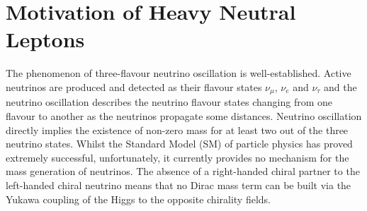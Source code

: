 \section{Motivation of Heavy Neutral Leptons}
\label{sec2Overview}



The phenomenon of three-flavour neutrino oscillation is well-established.
Active neutrinos are produced and detected as their flavour states $\nu_\mu$, $\nu_e$ and $\nu_\tau$ and the neutrino oscillation describes the neutrino flavour states changing from one flavour to another as the neutrinos propagate some distances.
Neutrino oscillation directly implies the existence of non-zero mass for at least two out of the three neutrino states.
Whilst the Standard Model (SM) of particle physics has proved extremely successful, unfortunately, it currently provides no mechanism for the mass generation of neutrinos.
The absence of a right-handed chiral partner to the left-handed chiral neutrino means that no Dirac mass term can be built via the Yukawa coupling of the Higgs to the opposite chirality fields.

